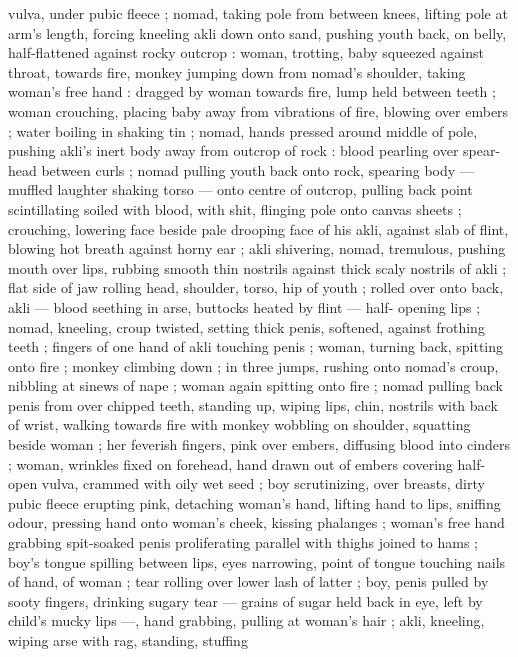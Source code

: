 {vulva, under pubic fleece ; nomad, taking pole from between knees, 
lifting pole at arm's length, forcing kneeling akli down onto sand, 
pushing youth back, on belly, half-flattened against rocky outcrop : 
woman, trotting, baby squeezed against throat, towards fire, monkey 
jumping down from nomad's shoulder, taking woman's free hand : 
dragged by woman towards fire, lump held between teeth ; woman 
crouching, placing baby away from vibrations of fire, blowing over 
embers ; water boiling in shaking tin ; nomad, hands pressed around 
middle of pole, pushing akli's inert body away from outcrop of rock 
: blood pearling over spear-head between curls ; nomad pulling 
youth back onto rock, spearing body --- muffled laughter shaking 
torso --- onto centre of outcrop, pulling back point scintillating 
soiled with blood, with shit, flinging pole onto canvas sheets ; 
crouching, lowering face beside pale drooping face of his akli, 
against slab of flint, blowing hot breath against horny ear ; akli 
shivering, nomad, tremulous, pushing mouth over lips, rubbing 
smooth thin nostrils against thick scaly nostrils of akli ; flat side of 
jaw rolling head, shoulder, torso, hip of youth ; rolled over onto back, 
akli --- blood seething in arse, buttocks heated by flint --- half- 
opening lips ; nomad, kneeling, croup twisted, setting thick penis, 
softened, against frothing teeth ; fingers of one hand of akli 
touching penis ; woman, turning back, spitting onto fire ; monkey 
climbing down ; in three jumps, rushing onto nomad's croup, nibbling 
at sinews of nape ; woman again spitting onto fire ; nomad pulling 
back penis from over chipped teeth, standing up, wiping lips, chin, 
nostrils with back of wrist, walking towards fire with monkey wobbling 
on shoulder, squatting beside woman ; her feverish fingers, pink over 
embers, diffusing blood into cinders ; woman, wrinkles fixed on 
forehead, hand drawn out of embers covering half-open vulva, 
crammed with oily wet seed ; boy scrutinizing, over breasts, dirty 
pubic fleece erupting pink, detaching woman's hand, lifting hand to 
lips, sniffing odour, pressing hand onto woman's cheek, kissing 
phalanges ; woman's free hand grabbing spit-soaked penis 
proliferating parallel with thighs joined to hams ; boy's tongue 
spilling between lips, eyes narrowing, point of tongue touching nails 
of hand, of woman ; tear rolling over lower lash of latter ; boy, penis 
pulled by sooty fingers, drinking sugary tear --- grains of sugar held 
back in eye, left by child's mucky lips ---, hand grabbing, pulling at 
woman's hair ; akli, kneeling, wiping arse with rag, standing, stuffing 
}
